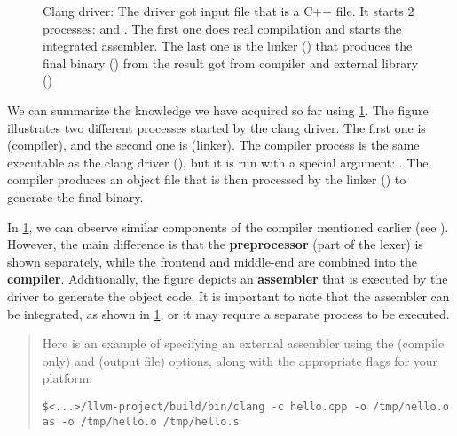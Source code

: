 \begin{figure}
\begin{center}
\begin{adjustbox}{totalheight=\baselineskip}
    \end{adjustbox}
  \end{center}
  \caption{Clang driver: The driver got input file 
    that is a C++ file. It starts 2 processes:  and .
    The first one does real compilation and starts the integrated assembler. The
    last one is the linker () that produces the final binary
    () from the result got from compiler and external library
    ()}  
  \label{fig:clang_driver_combined}
\end{figure}
We can summarize the knowledge we have acquired so far using
\cref{fig:clang_driver_combined}. The figure illustrates two different processes
started by the clang driver. The first one is  (compiler),
and the second one is  (linker). The compiler process is the same
executable as the clang driver (), but it is run with a special
argument: . The compiler produces an object file that is then
processed by the linker () to generate the final binary. 

In \cref{fig:clang_driver_combined}, we can observe similar components of the
compiler mentioned earlier (see ). However, the
main difference is that the \textbf{preprocessor} (part of the lexer) is shown
separately, while the frontend and middle-end are combined into the
\textbf{compiler}. Additionally, the figure depicts an \textbf{assembler} that
is executed by the driver to generate the object code. It is important to note
that the assembler can be integrated, as shown in
\cref{fig:clang_driver_combined}, or it may require a separate process to be
executed. 

\begin{quote}
Here is an example of specifying an external assembler using the 
(compile only) and  (output file) options, along with the
appropriate flags for your platform: 

\begin{adjustwidth}{0em}{0em}
\begin{verbatim}
$<...>/llvm-project/build/bin/clang -c hello.cpp -o /tmp/hello.o
as -o /tmp/hello.o /tmp/hello.s
\end{verbatim}
\end{adjustwidth}
\end{quote}

